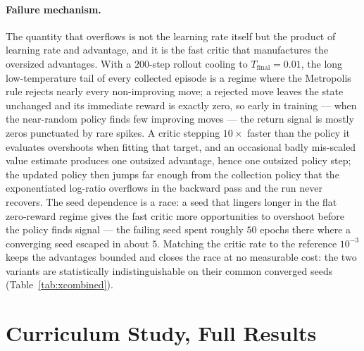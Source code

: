 \documentclass[letterpaper]{article} %
\begin{document}
\paragraph{Failure mechanism.}
The quantity that overflows is not the learning rate itself but the product of learning rate and advantage, and it is the fast critic that manufactures the oversized advantages. With a $200$-step rollout cooling to $T_{\mathrm{final}} = 0.01$, the long low-temperature tail of every collected episode is a regime where the Metropolis rule rejects nearly every non-improving move; a rejected move leaves the state unchanged and its immediate reward is exactly zero, so early in training --- when the near-random policy finds few improving moves --- the return signal is mostly zeros punctuated by rare spikes. A critic stepping $10\times$ faster than the policy it evaluates overshoots when fitting that target, and an occasional badly mis-scaled value estimate produces one outsized advantage, hence one outsized policy step; the updated policy then jumps far enough from the collection policy that the exponentiated log-ratio overflows in the backward pass and the run never recovers. The seed dependence is a race: a seed that lingers longer in the flat zero-reward regime gives the fast critic more opportunities to overshoot before the policy finds signal --- the failing seed spent roughly $50$ epochs there where a converging seed escaped in about $5$. Matching the critic rate to the reference $10^{-3}$ keeps the advantages bounded and closes the race at no measurable cost: the two variants are statistically indistinguishable on their common converged seeds (Table~\ref{tab:xcombined}).

\section{Curriculum Study, Full Results}
\label{app:cl}
\end{document}
